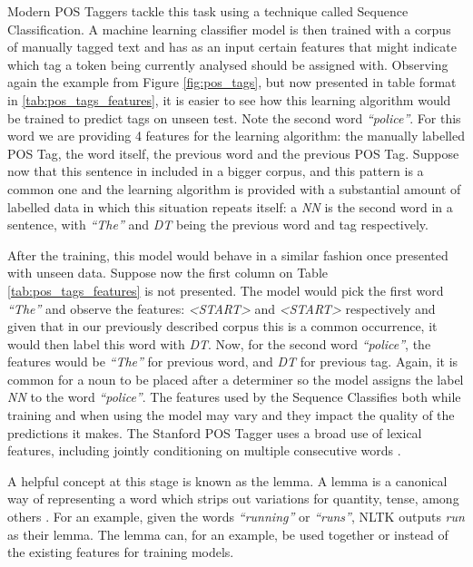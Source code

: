 \documentclass[11pt,a4paper,openright]{memoir}
\begin{document}
Modern POS Taggers tackle this task using a technique called Sequence Classification. A machine learning classifier model is then trained with a corpus of manually tagged text and has as an input certain features that might indicate which tag a token being currently analysed should be assigned with. Observing again the example from Figure \ref{fig:pos_tags}, but now presented in table format in \ref{tab:pos_tags_features}, it is easier to see how this learning algorithm would be trained to predict tags on unseen test. Note the second word \emph{\enquote{police}}. For this word we are providing 4 features for the learning algorithm: the manually labelled POS Tag, the word itself, the previous word and the previous POS Tag. Suppose now that this sentence in included in a bigger corpus, and this pattern is a common one and the learning algorithm is provided with a substantial amount of labelled data in which this situation repeats itself: a \emph{NN} is the second word in a sentence, with \emph{\enquote{The}} and \emph{DT} being the previous word and tag respectively.

After the training, this model would behave in a similar fashion once presented with unseen data. Suppose now the first column on Table \ref{tab:pos_tags_features} is not presented. The model would pick the first word \emph{\enquote{The}} and observe the features: \emph{<START>} and \emph{<START>} respectively and given that in our previously described corpus this is a common occurrence, it would then label this word with \emph{DT}. Now, for the second word \emph{\enquote{police}}, the features would be \emph{\enquote{The}} for previous word, and \emph{DT} for previous tag. Again, it is common for a noun to be placed after a determiner so the model assigns the label \emph{NN} to the word \emph{\enquote{police}}. The features used by the Sequence Classifies both while training and when using the model may vary and they impact the quality of the predictions it makes. The Stanford POS Tagger uses a broad use of lexical features, including jointly conditioning on multiple consecutive words \cite{Toutanova:2003:FPT:1073445.1073478}.

A helpful concept at this stage is known as the lemma. A lemma is a canonical way of representing a word which strips out variations for quantity, tense, among others \cite{Jurafsky:2000:SLP:555733}. For an example, given the words \emph{\enquote{running}} or \emph{\enquote{runs}}, NLTK \cite{BirdKleinLoper09} outputs \emph{run} as their lemma. The lemma can, for an example, be used together or instead of the existing features for training models.
\end{document}
